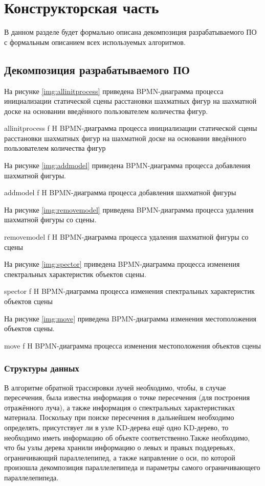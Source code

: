 \chapter{Конструкторская часть}

В данном разделе будет формально описана декомпозиция разрабатываемого ПО с формальным описанием всех используемых алгоритмов.

\section{Декомпозиция разрабатываемого ПО}

На рисунке \ref{img:allinitprocess} приведена BPMN-диаграмма процесса инициализации статической сцены расстановки шахматных фигур на шахматной доске на основании введённого пользователем количества фигур.

{allinitprocess}
{f}
{H}
{\textwidth}
{BPMN-диаграмма процесса инициализации статической сцены расстановки шахматных фигур на шахматной доске на основании введённого пользователем количества фигур}

На рисунке \ref{img:addmodel} приведена BPMN-диаграмма процесса добавления шахматной фигуры.

{addmodel}
{f}
{H}
{\textwidth}
{BPMN-диаграмма процесса добавления шахматной фигуры}

На рисунке \ref{img:removemodel} приведена BPMN-диаграмма процесса удаления шахматной фигуры со сцены.

{removemodel}
{f}
{H}
{\textwidth}
{BPMN-диаграмма процесса удаления шахматной фигуры со сцены}

На рисунке \ref{img:spector} приведена BPMN-диаграмма процесса изменения спектральных характеристик объектов сцены.

{spector}
{f}
{H}
{\textwidth}
{BPMN-диаграмма процесса изменения спектральных характеристик объектов сцены}

На рисунке \ref{img:move} приведена BPMN-диаграмма изменения местоположения объектов сцены.

{move}
{f}
{H}
{\textwidth}
{BPMN-диаграмма процесса изменения местоположения объектов сцены}

\subsection{Структуры данных}

В алгоритме обратной трассировки лучей необходимо, чтобы, в случае пересечения, была известна информация о точке пересечения (для построения отражённого луча), а также информация о спектральных характеристиках материала. 
Поскольку при поиске пересечения в дальнейшем необходимо определять, присутствует ли в узле KD-дерева ещё одно KD-дерево, то необходимо иметь информацию об объекте соответственно.Также необходимо, что бы узлы дерева хранили информацию о левых и правых поддеревьях, ограничивающий параллелепипед, а также направление о оси, по которой произошла декомпозиция параллелепипеда и параметры самого ограничивающего параллелепипеда.

